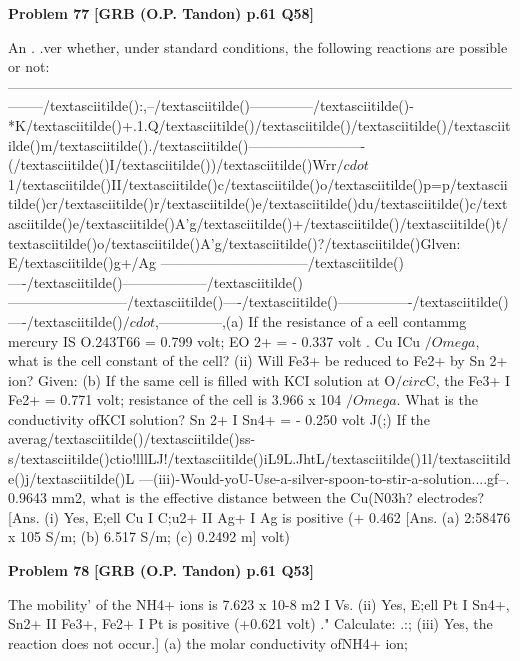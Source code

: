 \begin{problembox}
\textbf{Problem 77} \hfill \textbf{[GRB (O.P. Tandon) p.61 Q58]}
\label{q:ext-grb_all_questions-77}

An . .ver whether, under standard conditions, the following 
reactions are possible or not: 
--------------------------------------------------------------------------------------------------------------------/textasciitilde():,--/textasciitilde()--------------/textasciitilde()-*K/textasciitilde()+.1.Q/textasciitilde()/textasciitilde()/textasciitilde()/textasciitilde()m/textasciitilde()./textasciitilde()-------------------------(/textasciitilde()I/textasciitilde())/textasciitilde()Wrr$/cdot$ 
1/textasciitilde()II/textasciitilde()c/textasciitilde()o/textasciitilde()p=p/textasciitilde()cr/textasciitilde()r/textasciitilde()e/textasciitilde()du/textasciitilde()c/textasciitilde()e/textasciitilde()A'g/textasciitilde()+/textasciitilde()/textasciitilde()t/textasciitilde()o/textasciitilde()A'g/textasciitilde()?/textasciitilde()Glven: E/textasciitilde()g+/Ag 
--------------------------------/textasciitilde()----/textasciitilde()------------------/textasciitilde()--------------------------/textasciitilde()----/textasciitilde()----------------/textasciitilde()----/textasciitilde()$/cdot$,--------------,(a) If the resistance of a eell contammg mercury IS O.243T66 
= 0.799 volt; EO 2+ 
= - 0.337 volt 
. 
Cu 
ICu 
$/Omega$, what is the cell constant of the cell? 
(ii) Will Fe3+ be reduced to Fe2+ by Sn 2+ ion? Given: 
(b) If the same cell is filled with KCI solution at O$/circ$C, the 
Fe3+ I Fe2+ = 0.771 volt; 
resistance of the cell is 3.966 x 104 $/Omega$. What is the 
conductivity ofKCI solution? 
Sn 2+ I Sn4+ = - 0.250 volt 
\underline{\hspace{1cm}}J(;) If the 
averag/textasciitilde()\underline{\hspace{1cm}}/textasciitilde()ss-s/textasciitilde()ctio!lllLJ!/textasciitilde()iL9L.JhtL\underline{\hspace{1cm}}/textasciitilde()1l/textasciitilde()j/textasciitilde()L 
---(iii)-Would-yoU-Use-a-silver-spoon-to-stir-a-solution....gf--. 
0.9643 mm2, what is the effective distance between the 
Cu(N03h? 
electrodes? 
[Ans. 
(i) Yes, E;ell Cu I C;u2+ II Ag+ I Ag is positive (+ 0.462 
[Ans. (a) 2:58476 x 105 S/m; (b) 6.517 S/m; (c) 0.2492 m] 
volt)
\end{problembox}

\begin{problembox}
\textbf{Problem 78} \hfill \textbf{[GRB (O.P. Tandon) p.61 Q53]}
\label{q:ext-grb_all_questions-78}

The mobility' of the NH4+ ions is 7.623 x 10-8 m2 I Vs. 
(ii) Yes, 
E;ell 
Pt I Sn4+, Sn2+ II Fe3+, Fe2+ I Pt is positive 
(+0.621 volt) ." 
Calculate: 
.:; 
(iii) Yes, the reaction does not occur.] 
(a) the molar conductivity ofNH4+ ion;
\end{problembox}

